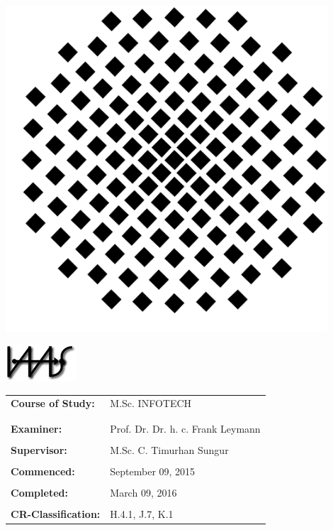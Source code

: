 \documentclass[paper=a4,       %
					 11pt,
					 BCOR0mm,  %
					 DIV10,    %
					 automark, %
					 twoside,
					 halfparskip,
					 bibtotoc,
					 headsepline,
					 normalheadings,
					 appendixprefix,
					 pagesize  %
 ]{scrbook}
\begin{document}
\begin{titlepage}
\begin{sffamily}
\begin{center}
\begin{minipage}{3cm}
\begin{center}
	\includegraphics[width=0.9\textwidth]{./gfx/unilogo.pdf}
\end{center}
\end{minipage}
\begin{minipage}{3cm}
\begin{center}
	\includegraphics{./gfx/iaas.jpg}
\end{center}
\end{minipage}
\end{center}
%
\vspace{1.0cm}
%
\begin{center}
\begin{tabular}{ll}
\textbf{Course of Study:} & M.Sc. INFOTECH\\
&\\&\\
\textbf{Examiner:} & Prof. Dr. Dr. h. c. Frank Leymann\\
&\\
\textbf{Supervisor:} & M.Sc. C. Timurhan Sungur\\
&\\                     
\textbf{Commenced:} & September 09, 2015\\
&\\
\textbf{Completed:} & March 09, 2016\\
&\\
\textbf{CR-Classification:} & H.4.1, J.7, K.1\\

\end{tabular}
\end{center}
\end{sffamily}
\end{titlepage}
\end{document}
